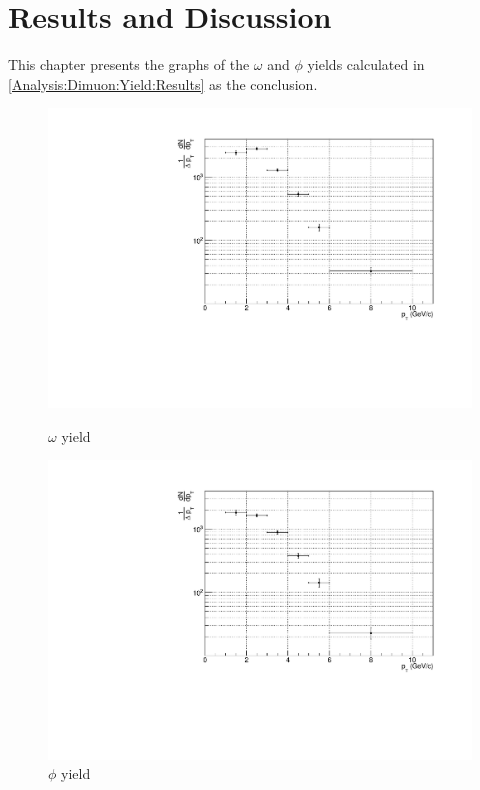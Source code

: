 \newpage
\clearpage
\section{Results and Discussion}
This chapter presents the graphs of the $\omega$ and $\phi$ yields calculated in \ref{Analysis:Dimuon:Yield:Results} as the conclusion.
    \begin{figure}[htbp]
        \centering
        \begin{minipage}{0.45\textwidth} %
            \centering
            \includegraphics[width=\textwidth]{fig/4_omega_yield.pdf} %
            \caption{$\omega$ yield}
            \label{fig:omega_yield}
        \end{minipage}
        \hfill
        \begin{minipage}{0.45\textwidth}
            \centering
            \includegraphics[width=\textwidth]{fig/4_phi_yield.pdf} %
            \caption{$\phi$ yield}
            \label{fig:phi_yield}
        \end{minipage}
    \end{figure}
